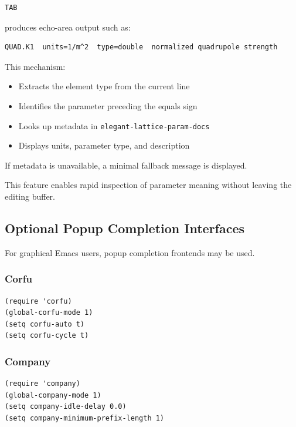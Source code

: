 \begin{lstlisting}
TAB
\end{lstlisting}

produces echo-area output such as:

\begin{lstlisting}
QUAD.K1  units=1/m^2  type=double  normalized quadrupole strength
\end{lstlisting}

This mechanism:

\begin{itemize}
\item Extracts the element type from the current line
\item Identifies the parameter preceding the equals sign
\item Looks up metadata in \texttt{elegant-lattice-param-docs}
\item Displays units, parameter type, and description
\end{itemize}

If metadata is unavailable, a minimal fallback message is displayed.

This feature enables rapid inspection of parameter meaning without leaving the editing buffer.

\subsection{Optional Popup Completion Interfaces}

For graphical Emacs users, popup completion frontends may be used.

\subsubsection*{Corfu}

\begin{lstlisting}
(require 'corfu)
(global-corfu-mode 1)
(setq corfu-auto t)
(setq corfu-cycle t)
\end{lstlisting}

\subsubsection*{Company}

\begin{lstlisting}
(require 'company)
(global-company-mode 1)
(setq company-idle-delay 0.0)
(setq company-minimum-prefix-length 1)
\end{lstlisting}

